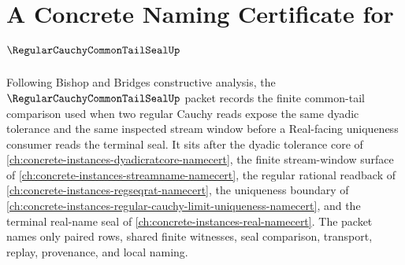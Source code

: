 \chapter{A Concrete Naming Certificate for $\RegularCauchyCommonTailSealUp$}
\label{ch:concrete-instances-regular-cauchy-common-tail-seal-namecert}

Following Bishop and Bridges constructive analysis, the $\RegularCauchyCommonTailSealUp$ packet records the finite common-tail comparison used when two regular Cauchy reads expose the same dyadic tolerance and the same inspected stream window before a Real-facing uniqueness consumer reads the terminal seal. It sits after the dyadic tolerance core of \autoref{ch:concrete-instances-dyadicratcore-namecert}, the finite stream-window surface of \autoref{ch:concrete-instances-streamname-namecert}, the regular rational readback of \autoref{ch:concrete-instances-regseqrat-namecert}, the uniqueness boundary of \autoref{ch:concrete-instances-regular-cauchy-limit-uniqueness-namecert}, and the terminal real-name seal of \autoref{ch:concrete-instances-real-namecert}. The packet names only paired rows, shared finite witnesses, seal comparison, transport, replay, provenance, and local naming.

